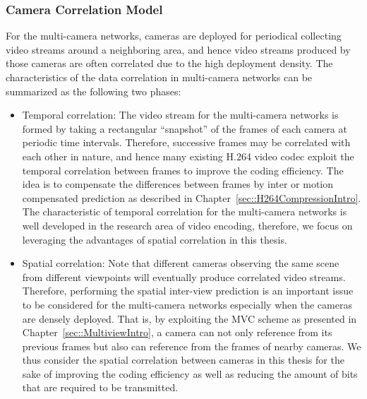 \subsubsection{Camera Correlation Model}
%
For the multi-camera networks, cameras are deployed for periodical collecting video streams around a neighboring area, and hence video streams produced by those cameras are often correlated due to the high deployment density.
The characteristics of the data correlation in multi-camera networks can be summarized as the following two phases:
\begin{itemize}
\item Temporal correlation: The video stream for the multi-camera networks is formed by taking a rectangular ``snapshot'' of the frames of each camera at periodic time intervals.
Therefore, successive frames may be correlated with each other in nature, and hence many existing H.264 video codec exploit the temporal correlation between frames to improve the coding efficiency.
The idea is to compensate the differences between frames by inter or motion compensated prediction as described in Chapter~\ref{sec::H264CompressionIntro}.
The characteristic of temporal correlation for the multi-camera networks is well developed in the research area of video encoding, therefore, we focus on leveraging the advantages of spatial correlation in this thesis.
\item Spatial correlation: Note that different cameras observing the same scene from different viewpoints will eventually produce correlated video streams.
Therefore, performing the spatial inter-view prediction is an important issue to be considered for the multi-camera networks especially when the cameras are densely deployed.
That is, by exploiting the MVC scheme as presented in Chapter~\ref{sec::MultiviewIntro}, a camera can not only reference from its previous frames but also can reference from the frames of nearby cameras.
We thus consider the spatial correlation between cameras in this thesis for the sake of improving the coding efficiency as well as reducing the amount of bits that are required to be transmitted.  
\end{itemize}
%

